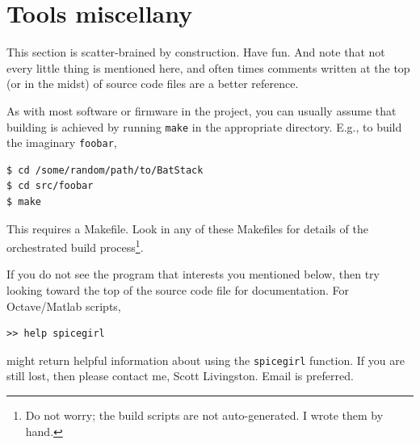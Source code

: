 \documentclass[letterpaper]{article}
\begin{document}
\section{Tools miscellany}
\label{misctools:sec}

This section is scatter-brained by construction. Have fun. And note
that not every little thing is mentioned here, and often times
comments written at the top (or in the midst) of source code files are
a better reference.

As with most software or firmware in the project, you can usually
assume that building is achieved by running \texttt{make} in the
appropriate directory. E.g., to build the imaginary \texttt{foobar},
\begin{verbatim}
$ cd /some/random/path/to/BatStack
$ cd src/foobar
$ make
\end{verbatim}
This requires a Makefile. Look in any of these Makefiles for details
of the orchestrated build process\footnote{Do not worry; the build
  scripts are not auto-generated. I wrote them by hand.}.

If you do not see the program that interests you mentioned below, then
try looking toward the top of the source code file for
documentation. For Octave/Matlab scripts, 
\begin{verbatim}
>> help spicegirl
\end{verbatim}
might return helpful information about using the \texttt{spicegirl}
function. If you are still lost, then please contact me, Scott
Livingston. Email is preferred.
\end{document}
